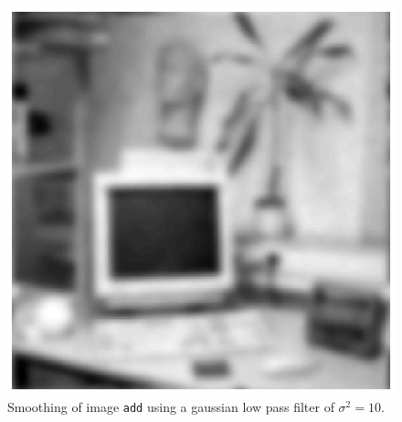 \begin{minipage}{\linewidth}
\begin{minipage}{0.4\linewidth}
\begin{figure}[H]
      \includegraphics[scale=0.6]{./images/Q17/discgaussfft/add_10.eps}
      \caption{Smoothing of image \texttt{add} using a gaussian low pass filter of $\sigma^2 = 10$.}
      \label{fig:Q17_discgaussfft_add_10}
    \end{figure}
  \end{minipage}
\end{minipage}
\\


